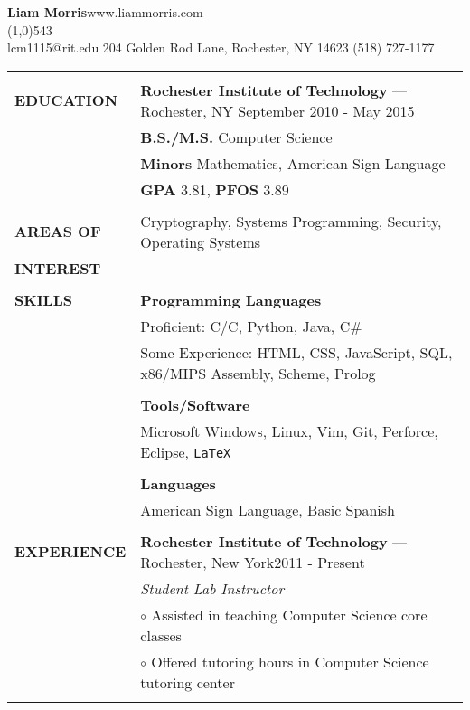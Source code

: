 \documentclass[10pt,letterpaper]{article}
\newcommand{\CPP}
{C\nolinebreak[4]\hspace{-.05em}\raisebox{.22ex}{\footnotesize\bf ++}}
\begin{document}
\raggedright

\textbf{\huge{Liam Morris}}\hfill www.liammorris.com\\
\vspace{-8pt}
\line(1,0){543}\\
lcm1115@rit.edu \hfill 204 Golden Rod Lane, Rochester, NY 14623 \hfill (518)
727-1177\\
\vspace{5pt}

\begin{tabular}{@{}lp{6.6in}}
&\\
\textbf{EDUCATION}
&\textbf{Rochester Institute of Technology} --- Rochester, NY \hfill September 2010 - May 2015\\
&\textbf{B.S./M.S.} Computer Science\\
&\textbf{Minors} Mathematics, American Sign Language\\
&\textbf{GPA} 3.81, \textbf{PFOS} 3.89\\
&\\
\textbf{AREAS OF}
&Cryptography, Systems Programming, Security, Operating Systems\\
\textbf{INTEREST}&\\
&\\
\textbf{SKILLS}
&\textbf{Programming Languages}\\
&Proficient: C/\CPP, Python, Java, C\#\\
&Some Experience: HTML, CSS, JavaScript, SQL, x86/MIPS Assembly, Scheme, Prolog\\
&\\
&\textbf{Tools/Software}\\
&Microsoft Windows, Linux, Vim, Git, Perforce, Eclipse, \texttt{\LaTeX}\\
&\\
&\textbf{Languages}\\
&American Sign Language, Basic Spanish\\
&\\
\textbf{EXPERIENCE}
&\textbf{Rochester Institute of Technology} --- Rochester, New York\hfill 2011 - Present\\
&\emph{Student Lab Instructor}\\
&\hspace{10pt}$\circ$ Assisted in teaching Computer Science core classes\\
&\hspace{10pt}$\circ$ Offered tutoring hours in Computer Science tutoring center\\
&\\

\end{tabular}
\end{document}
